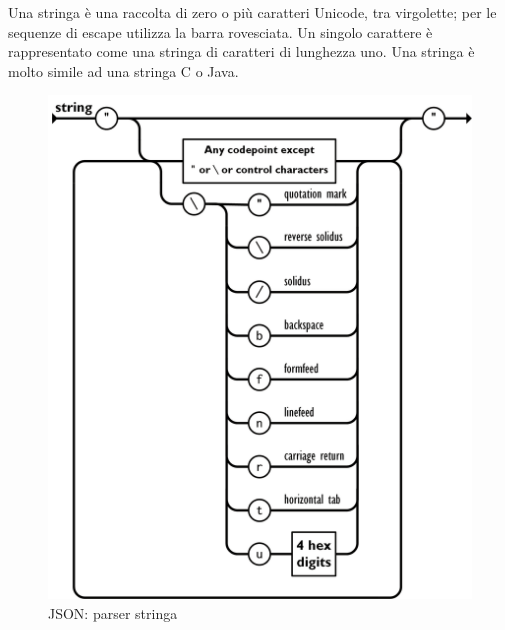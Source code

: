 \documentclass[11pt,a4paper]{book}
\begin{document}
\clearpage
Una stringa è una raccolta di zero o più caratteri Unicode, tra virgolette; per le sequenze di escape utilizza la barra rovesciata. Un singolo carattere è rappresentato come una stringa di caratteri di lunghezza uno. Una stringa è molto simile ad una stringa C o Java.
\begin{figure}[h!]
	\begin{center}
		\includegraphics[scale=0.6]{img/005.png}
		\caption{JSON: parser stringa}
		\label{fig: 005}
	\end{center}
\end{figure}
\end{document}
